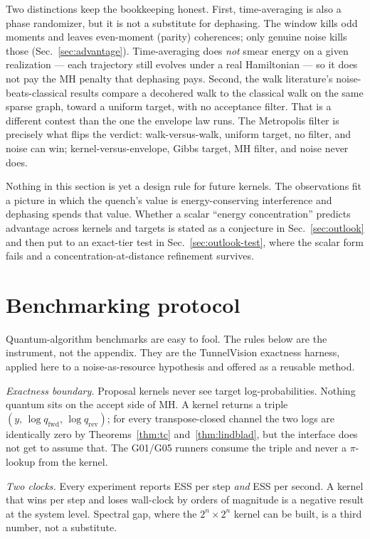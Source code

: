 \documentclass[aps,prx,reprint,floatfix,amsmath,amssymb,amsfonts]{revtex4-2}
\begin{document}
Two distinctions keep the bookkeeping honest. First, time-averaging is
also a phase randomizer, but it is not a substitute for dephasing. The
window kills odd moments and leaves even-moment (parity) coherences;
only genuine noise kills those (Sec.~\ref{sec:advantage}).
Time-averaging does \emph{not} smear energy on a given realization ---
each trajectory still evolves under a real Hamiltonian --- so it does
not pay the MH penalty that dephasing pays. Second, the walk
literature's noise-beats-classical results compare a decohered walk to
the classical walk on the same sparse graph, toward a uniform target,
with no acceptance filter. That is a different contest than the one the
envelope law runs. The Metropolis filter is precisely what flips the
verdict: walk-versus-walk, uniform target, no filter, and noise can win;
kernel-versus-envelope, Gibbs target, MH filter, and noise never does.

Nothing in this section is yet a design rule for future kernels. The
observations fit a picture in which the quench's value is
energy-conserving interference and dephasing spends that value. Whether
a scalar ``energy concentration'' predicts advantage across kernels and
targets is stated as a conjecture in Sec.~\ref{sec:outlook} and then
put to an exact-tier test in Sec.~\ref{sec:outlook-test}, where the
scalar form fails and a concentration-at-distance refinement survives.

\section{Benchmarking protocol}
\label{sec:protocol}

Quantum-algorithm benchmarks are easy to fool. The rules below are the
instrument, not the appendix. They are the TunnelVision exactness
harness, applied here to a noise-as-resource hypothesis and offered as a
reusable method.

\emph{Exactness boundary.}
Proposal kernels never see target log-probabilities. Nothing quantum
sits on the accept side of MH. A kernel returns a triple
$(y,\, \log q_{\mathrm{fwd}},\, \log q_{\mathrm{rev}})$; for every
transpose-closed channel the two logs are identically zero by
Theorems~\ref{thm:tc} and~\ref{thm:lindblad}, but the interface does not
get to assume that. The G01/G05 runners consume the triple and never a
$\pi$-lookup from the kernel.

\emph{Two clocks.}
Every experiment reports ESS per step \emph{and} ESS per second. A
kernel that wins per step and loses wall-clock by orders of magnitude is
a negative result at the system level. Spectral gap, where the
$2^n\times 2^n$ kernel can be built, is a third number, not a
substitute.
\end{document}
